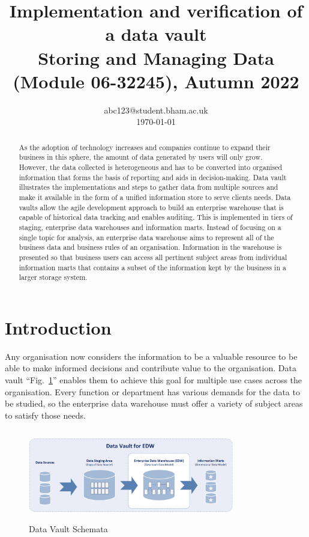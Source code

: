 \documentclass[conference]{IEEEtran}
\begin{document}
\title{Implementation and verification of a data vault\\\Large Storing and Managing Data (Module 06-32245), Autumn 2022}

\author{
abc123@student.bham.ac.uk\\
\today}


\maketitle

\begin{abstract}
As the adoption of technology increases and companies continue to expand their business in this sphere, the amount of data generated by users will only grow. However, the data collected is heterogeneous and has to be converted into organised information that forms the basis of reporting and aids in decision-making. Data vault illustrates the implementations and steps to gather data from multiple sources and make it available in the form of a unified information store to serve clients needs. Data vaults allow the agile development approach to build an enterprise warehouse that is capable of historical data tracking and enables auditing. This is implemented in tiers of staging, enterprise data warehouses and information marts. Instead of focusing on a single topic for analysis, an enterprise data warehouse aims to represent all of the business data and business rules of an organisation. Information in the warehouse is presented so that business users can access all pertinent subject areas from individual information marts that contains a subset of the information kept by the business in a larger storage system.
\end{abstract}

\section{Introduction}\label{sec:Intro}
Any organisation now considers the information to be a valuable resource to be able to make informed decisions and contribute value to the organisation. Data vault ``Fig.~\ref{fig1}'' enables them to achieve this goal for multiple use cases across the organisation. Every function or department has various demands for the data to be studied, so the enterprise data warehouse must offer a variety of subject areas to satisfy those needs.


\begin{figure}[htbp]
\centerline{\includegraphics[width=9cm, height=4cm]{Figure1.png}}
\caption{Data Vault Schemata}
\label{fig1}
\end{figure}
\end{document}
